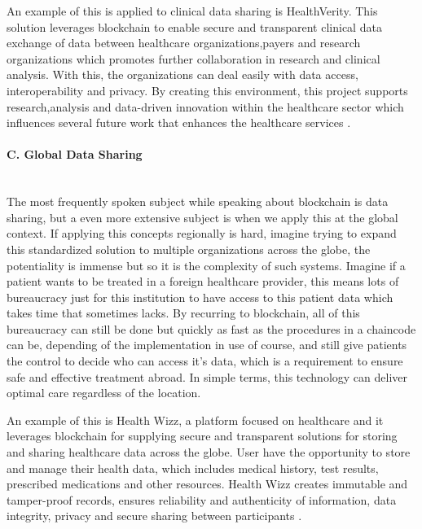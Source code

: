 An example of this is applied to clinical data sharing is HealthVerity. This solution leverages blockchain to enable secure and transparent clinical data exchange of data between healthcare organizations,payers and research organizations which promotes further collaboration in research and clinical analysis. With this, the organizations can deal easily with data access, interoperability and privacy. By creating this environment, this project supports research,analysis and data-driven innovation within the healthcare sector which influences several future work that enhances the healthcare services \cite{block-apps-increased-transparency} \cite{health-verity}.

\paragraph{C. Global Data Sharing} \mbox{}\\
The most frequently spoken subject while speaking about blockchain is data sharing, but a even more extensive subject is when we apply this at the global context. If applying this concepts regionally is hard, imagine trying to expand this standardized solution to multiple organizations across the globe, the potentiality is immense but so it is the complexity of such systems. Imagine if a patient wants to be treated in a foreign healthcare provider, this means lots of bureaucracy just for this institution to have access to this patient data which takes time that sometimes lacks. By recurring to blockchain, all of this bureaucracy can still be done but quickly as fast as the procedures in a chaincode can be, depending of the implementation in use of course, and still give patients the control to decide who can access it's data, which is a requirement to ensure safe and effective treatment abroad. In simple terms, this technology can deliver optimal care regardless of the location.

An example of this is Health Wizz, a platform focused on healthcare and it leverages blockchain for supplying secure and transparent solutions for storing and sharing healthcare data across the globe. User have the opportunity to store and manage their health data, which includes medical history, test results, prescribed medications and other resources. Health Wizz creates immutable and tamper-proof records, ensures reliability and authenticity of information, data integrity, privacy and secure sharing between participants \cite{health-wizz} \cite{blockchain-pharmaceutical-cold-chain}. 

